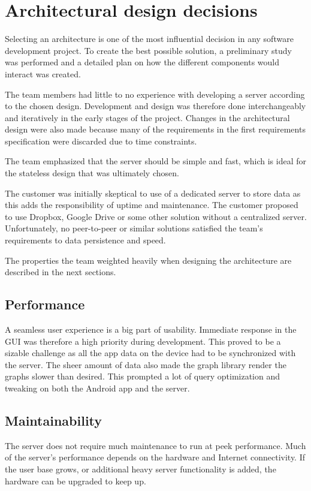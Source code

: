 \section{Architectural design decisions}
\label{sec:arch_design}
Selecting an architecture is one of the most influential decision in any software development project. To create the best possible solution, a preliminary study was performed and a detailed plan on how the different components would interact was created. 

The team members had little to no experience with developing a server according to the chosen design. Development and design was therefore done interchangeably and iteratively in the early stages of the project. Changes in the architectural design were also made because many of the requirements in the first requirements specification were discarded due to time constraints.

The team emphasized that the server should be simple and fast, which is ideal for the stateless design that was ultimately chosen. 

The customer was initially skeptical to use of a dedicated server to store data as this adds the responsibility of uptime and maintenance. The customer proposed to use Dropbox, Google Drive or some other solution without a centralized server. Unfortunately, no peer-to-peer or similar solutions satisfied the team's requirements to data persistence and speed.

The properties the team weighted heavily when designing the architecture are described in the next sections.

\subsection{Performance}
A seamless user experience is a big part of usability. Immediate response in the GUI was therefore a high priority during development. This proved to be a sizable challenge as all the app data on the device had to be synchronized with the server. 
The sheer amount of data also made the graph library render the graphs slower than desired. This prompted a lot of query optimization and tweaking on both the Android app and the server. 

\subsection{Maintainability}
The server does not require much maintenance to run at peek performance. Much of the server's performance depends on the hardware and Internet connectivity. If the user base grows, or additional heavy server functionality is added, the hardware can be upgraded to keep up.

